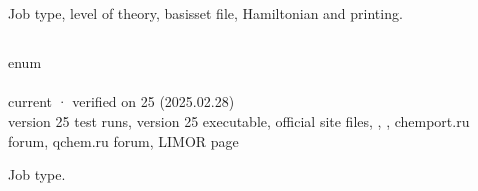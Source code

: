 \documentclass[letterpaper,10pt,english,openany,oneside]{sphinxmanual}
\begin{document}
\sphinxAtStartPar
{}

\begin{sphinxVerbatim}[commandchars=\\\{\}]
\end{sphinxVerbatim}

\sphinxstepscope




\section{}
\label{\detokenize{reference/control:control}}\label{\detokenize{reference/control:group-control}}\label{\detokenize{reference/control::doc}}
\ignorespaces 
\sphinxAtStartPar
Job type, level of theory, basis\sphinxhyphen{}set file, Hamiltonian and printing.


\subsection{}
\label{\detokenize{reference/control:task}}\label{\detokenize{reference/control:control-task}}
\ignorespaces 
\sphinxAtStartPar
{} enum\\
 \\
 current · verified on 25 (2025.02.28)\\
 version 25 test runs, version 25 executable, official site files, , , chemport.ru forum, qchem.ru forum, LIMOR page

\sphinxAtStartPar
Job type.
\end{document}
